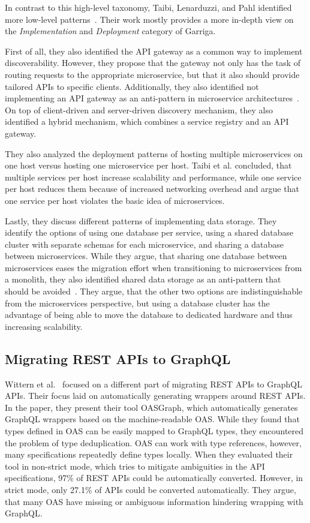 In contrast to this high-level taxonomy, Taibi, Lenarduzzi, and Pahl identified more low-level patterns~\cite{Taibi2018}.
Their work mostly provides a more in-depth view on the \textit{Implementation} and \textit{Deployment} category of Garriga.

First of all, they also identified the \ac{API} gateway as a common way to implement discoverability.
However, they propose that the gateway not only has the task of routing requests to the appropriate microservice, but that it also should provide tailored \acp{API} to specific clients.
Additionally, they also identified not implementing an \ac{API} gateway as an anti-pattern in microservice architectures~\cite{Taibi2020}.
On top of client-driven and server-driven discovery mechanism, they also identified a hybrid mechanism, which combines a service registry and an \ac{API} gateway.

They also analyzed the deployment patterns of hosting multiple microservices on one host versus hosting one microservice per host.
Taibi et al. concluded, that multiple services per host increase scalability and performance, while one service per host reduces them because of increased networking overhead and argue that one service per host violates the basic idea of microservices.

Lastly, they discuss different patterns of implementing data storage.
They identify the options of using one database per service, using a shared database cluster with separate schemas for each microservice, and sharing a database between microservices.
While they argue, that sharing one database between microservices eases the migration effort when transitioning to microservices from a monolith, they also identified shared data storage as an anti-pattern that should be avoided~\cite{Taibi2020}.
They argue, that the other two options are indistinguishable from the microservices perspective, but using a database cluster has the advantage of being able to move the database to dedicated hardware and thus increasing scalability.

\subsection{Migrating \acs{REST} \acsp{API} to GraphQL}\label{sec:rel-2}

Wittern et al.~\cite{Wittern2019} focused on a different part of migrating \ac{REST} \acp{API} to GraphQL \acp{API}.
Their focus laid on automatically generating wrappers around \ac{REST} \acp{API}.
In the paper, they present their tool \acs{OAS}Graph, which automatically generates GraphQL wrappers based on the machine-readable \ac{OAS}.
While they found that types defined in \ac{OAS} can be easily mapped to GraphQL types, they encountered the problem of type deduplication.
\ac{OAS} can work with type references, however, many specifications repeatedly define types locally.
When they evaluated their tool in non-strict mode, which tries to mitigate ambiguities in the \ac{API} specifications, 97\% of \ac{REST} \acp{API} could be automatically converted.
However, in strict mode, only 27.1\% of \acp{API} could be converted automatically.
They argue, that many \ac{OAS} have missing or ambiguous information hindering wrapping with GraphQL.

